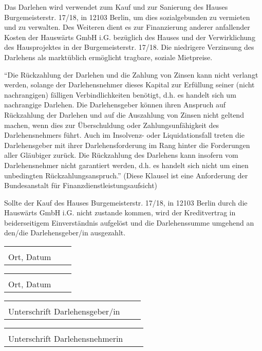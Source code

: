\documentclass[]{scrartcl}
\begin{document}
\begin{contract}
Das Darlehen wird verwendet zum Kauf und zur Sanierung des Hauses Burgemeisterstr. 17/18, in 12103 Berlin, um dies sozialgebunden zu vermieten und zu verwalten. Des Weiteren dient es zur Finanzierung anderer anfallender Kosten der Hauswärts GmbH i.G. bezüglich des Hauses und der Verwirklichung des Hausprojektes in der Burgemeisterstr. 17/18. Die niedrigere Verzinsung des Darlehens als marktüblich ermöglicht tragbare, soziale Mietpreise.

“Die Rückzahlung der Darlehen und die Zahlung von Zinsen kann nicht verlangt werden, solange der Darlehensnehmer dieses Kapital zur Erfüllung seiner (nicht nachrangigen) fälligen Verbindlichkeiten benötigt, d.h. es handelt sich um nachrangige Darlehen. Die Darlehensgeber können ihren Anspruch auf Rückzahlung der Darlehen und auf die Auszahlung von Zinsen nicht geltend machen, wenn dies zur Überschuldung oder Zahlungsunfähigkeit des Darlehensnehmers führt. Auch im Insolvenz- oder Liquidationsfall treten die Darlehensgeber mit ihrer Darlehensforderung im Rang hinter die Forderungen aller Gläubiger zurück. Die Rückzahlung des Darlehens kann insofern vom Darlehensnehmer nicht garantiert werden, d.h. es handelt sich nicht um einen unbedingten Rückzahlungsanspruch.” (Diese Klausel ist eine Anforderung der Bundesanstalt für Finanzdienstleistungsaufsicht)

Sollte der Kauf des Hauses Burgemeisterstr. 17/18, in 12103 Berlin durch die Hauswärts GmbH i.G. nicht zustande kommen, wird der Kreditvertrag in beiderseitigem Einverständnis aufgelöst und die Darlehenssumme umgehend an den/die Darlehensgeber/in ausgezahlt.

\end{contract}

\vspace{1,5 cm}
\begin{tabular}{p{7cm}p{.5cm}l}
\dotfill \\
Ort, Datum
\end{tabular}%
\hfill
\begin{tabular}{p{7cm}p{.5cm}l}
\dotfill \\
Ort, Datum
\end{tabular}%

\vspace{1,5 cm}
\begin{tabular}{p{7cm}p{.5cm}l}
\dotfill \\
Unterschrift Darlehensgeber/in
\end{tabular}%
\hfill
\begin{tabular}{p{7cm}p{.5cm}l}
\dotfill \\
Unterschrift Darlehensnehmerin
\end{tabular}%
\end{document}
